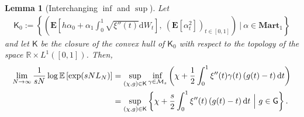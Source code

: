 \documentclass[11pt]{amsart}
\newtheorem{lemma}[proposition]{Lemma}
\theoremstyle{remark}
\theoremstyle{definition}
\numberwithin{equation}{section}
\numberwithin{proposition}{section}
\numberwithin{figure}{section}
\numberwithin{table}{section}
\newcommand{\R}{\mathbb{R}}
\newcommand{\E}{\mathbb{E}}
\newcommand{\EE}{\mathbf{E}}
\newcommand{\Ll}{\left}
\newcommand{\Rr}{\right}
\renewcommand{\d}{\mathrm{d}}
\newcommand{\1}{\mathbf{1}}
\newcommand{\mcl}{\mathcal}
\newcommand{\msf}{\mathsf}
\newcommand{\al}{\alpha}
\newcommand{\bmart}{\mathbf{Mart}}
\begin{document}
\begin{lemma}[Interchanging $\inf$ and $\sup$]\label{l.inter_inf_sup}
Let
\begin{align*}
    \msf K_0 := \Ll\{\Ll(\EE\Ll[h \al_0+\alpha_1\int_0^1\sqrt{\xi''(t)}\d W_t\Rr],\ \Ll(\EE[\alpha^2_t]\Rr)_{t\in[0,1]}\Rr)\ \bigg|\ \alpha\in\bmart_1\Rr\}
\end{align*}
and let $\msf K$ be the closure of the convex hull of $\msf K_0$ with respect to the topology of the space $\R\times L^1([0,1])$. Then,
\begin{align}
    \lim_{N\to \infty} \frac{1}{sN} \log \E \Ll[ \exp(sN L_N) \Rr] &= \sup_{(\chi,g)\in\msf K}\inf_{\gamma\in\mcl M_s}\Ll(\chi+\frac{1}{2}\int_0^1 \xi''(t)\gamma(t)\Ll(g(t) -t \Rr)\d t\Rr)\notag
    \\
    &=\sup_{(\chi,g)\in\msf K}\Ll\{\chi+\frac{s}{2}\int_0^1 \xi''(t)\Ll(g(t) -t \Rr)\d t\ \Big|\ g\in \msf G\Rr\}. \label{e.inter_inf_sup}
\end{align}
\end{lemma}
\end{document}
